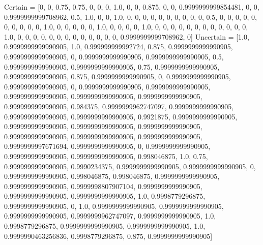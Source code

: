 \documentclass{icmmcm}
\begin{document}
Certain = [0, 0, 0.75, 0.75, 0, 0, 0, 1.0, 0, 0, 0.875, 0, 0, 0.9999999999854481, 0, 0, 0.9999999999708962, 0.5, 1.0, 0, 0, 1.0, 0, 0, 0, 0, 0, 0, 0, 0, 0, 0, 0.5, 0, 0, 0, 0, 0, 0, 0, 0, 0, 0, 1.0, 0, 0, 0, 0, 0, 1.0, 0, 0, 0, 0, 1.0, 0, 0, 0, 0, 0, 0, 0, 0, 0, 0, 0, 0, 1.0, 0, 0, 0, 0, 0, 0, 0, 0, 0, 0, 0, 0, 0, 0.9999999999708962, 0]
Uncertain = [1.0, 0.9999999999990905, 1.0, 0.999999999992724, 0.875, 0.9999999999990905, 0.9999999999990905, 0, 0.9999999999990905, 0.9999999999990905, 0.5, 0.9999999999990905, 0.9999999999990905, 0.75, 0.9999999999990905, 0.9999999999990905, 0.875, 0.9999999999990905, 0, 0.9999999999990905, 0.9999999999990905, 0, 0.9999999999990905, 0.9999999999990905, 0.9999999999990905, 0.9999999999990905, 0.9999999999990905, 0.9999999999990905, 0.984375, 0.9999999962747097, 0.9999999999990905, 0.9999999999990905, 0.9999999999990905, 0.9921875, 0.9999999999990905, 0.9999999999990905, 0.9999999999990905, 0.9999999999990905, 0.9999999999990905, 0.9999999999990905, 0.9999999999990905, 0.9999999997671694, 0.9999999999990905, 0, 0.9999999999990905, 0.9999999999990905, 0.9999999999990905, 0.998046875, 1.0, 0.75, 0.9999999999990905, 0.9990234375, 0.9999999999990905, 0.9999999999990905, 0, 0.9999999999990905, 0.998046875, 0.998046875, 0.9999999999990905, 0.9999999999990905, 0.9999998807907104, 0.9999999999990905, 0.9999999999990905, 0.9999999999990905, 1.0, 0.9998779296875, 0.9999999999990905, 0, 1.0, 0.9999999999990905, 0.9999999999990905, 0.9999999999990905, 0.9999999962747097, 0.9999999999990905, 1.0, 0.9998779296875, 0.9999999999990905, 0.9999999999990905, 1.0, 0.9999990463256836, 0.9998779296875, 0.875, 0.9999999999990905]
\end{document}
